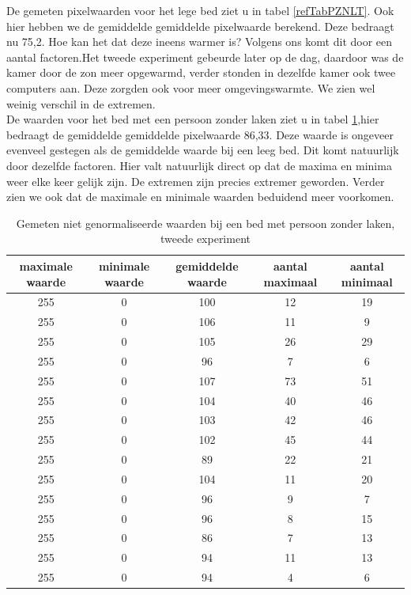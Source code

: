 De gemeten pixelwaarden voor het lege bed ziet u in tabel \ref{refTabPZNLT}. Ook hier hebben we de gemiddelde gemiddelde pixelwaarde berekend. Deze bedraagt nu 75,2. Hoe kan het dat deze ineens warmer is? Volgens ons komt dit door een aantal factoren.Het tweede experiment gebeurde later op de dag, daardoor was de kamer door de zon meer opgewarmd, verder stonden in dezelfde kamer ook twee computers aan. Deze zorgden ook voor meer omgevingswarmte. We zien wel weinig verschil in de extremen. \\
De waarden voor het bed met een persoon zonder laken ziet u in tabel \ref{refTabPZNPT},hier bedraagt de gemiddelde gemiddelde pixelwaarde 86,33. Deze waarde is ongeveer evenveel gestegen als de gemiddelde waarde bij een leeg bed. Dit komt natuurlijk door dezelfde factoren. Hier valt natuurlijk direct op dat de maxima en minima weer elke keer gelijk zijn. De extremen zijn precies extremer geworden. Verder zien we ook dat de maximale en minimale waarden beduidend meer voorkomen. \\
\begin{table}[hbp]
	\begin{tabular}{|c|c|c|c|c|}
		\hline
		maximale waarde & minimale waarde & gemiddelde waarde & aantal maximaal & aantal minimaal \\ \hline
		255 & 0 & 100 & 12 & 19 \\ \hline
		255 & 0 & 106 & 11 & 9  \\ \hline
		255 & 0 & 105 & 26 & 29 \\ \hline
		255 & 0 & 96  & 7  & 6 \\ \hline
		255 & 0 & 107 & 73 & 51  \\ \hline
		255 & 0 & 104 & 40 & 46 \\ \hline
		255 & 0 & 103 & 42 & 46 \\ \hline
		255 & 0 & 102 & 45 & 44 \\ \hline
		255 & 0 & 89  & 22 & 21 \\ \hline
		255 & 0 & 104 & 11 & 20 \\ \hline
		255 & 0 & 96  & 9  & 7 \\ \hline
		255 & 0 & 96  & 8  & 15 \\ \hline
		255 & 0 & 86  & 7  & 13  \\ \hline
		255 & 0 & 94  & 11 & 13 \\ \hline
		255 & 0 & 94  & 4  & 6  \\ \hline
	\end{tabular}
	\caption{Gemeten niet genormaliseerde waarden bij een bed met persoon zonder laken, tweede experiment}
	\label{refTabPZNPT}
\end{table}
